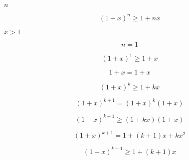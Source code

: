 \documentclass[10pt]{book}
\begin{document}
\begin{mdSnippets}
\begin{mdInlineSnippet}[7b8b965ad4bca0e41ab51de7b31363a1]%
$n$\end{mdInlineSnippet}%
\begin{mdDisplaySnippet}[f368a1526c7f504364b50aa4c541eb9f]%
\[%
(1 + x)^n \ge 1 + nx
\]%
\end{mdDisplaySnippet}%
\begin{mdInlineSnippet}[d0dfb6e138e2e13e9900819523d651fa]%
$x > 1$\end{mdInlineSnippet}%
\begin{mdDisplaySnippet}[ab78ccfbcd04b1ba22eb9427251cb20d]%
\[%
n = 1
\]%
\end{mdDisplaySnippet}%
\begin{mdDisplaySnippet}[d213d87543a5707039922f2022fb5e15]%
\[%
(1 + x)^1 \ge 1 + x
\]%
\end{mdDisplaySnippet}%
\begin{mdDisplaySnippet}[af12e9fe4c2d30b82ef9b33322d8890b]%
\[%
1 + x = 1 + x
\]%
\end{mdDisplaySnippet}%
\begin{mdDisplaySnippet}[599e8f94b0ed45cf9f5236d9879d57f4]%
\[%
(1 + x)^k \ge 1 + kx
\]%
\end{mdDisplaySnippet}%
\begin{mdDisplaySnippet}[31c9c43e2e03727806dd7f5014010353]%
\[%
(1 + x)^{k+1} = (1 + x)^k(1+x)  
\]%
\end{mdDisplaySnippet}%
\begin{mdDisplaySnippet}[d2f4a74515f36ec26b48f5077bafc2dd]%
\[%
(1 + x)^{k+1} \ge (1 + kx)(1 + x)
\]%
\end{mdDisplaySnippet}%
\begin{mdDisplaySnippet}[aa6cc59cde177e5a753a6c7a2e3a928f]%
\[%
(1 + x)^{k+1} = 1 + (k + 1)x + kx^2
\]%
\end{mdDisplaySnippet}%
\begin{mdDisplaySnippet}[7ce6aba1b945c6f9d05eb0d715b8f93d]%
\[%
(1 + x)^{k+1} \ge 1 + (k + 1)x
\]%
\end{mdDisplaySnippet}%
\begin{mdDisplaySnippet}[6904cef3f301c94a0fb1da23775ca5e0]%

\end{mdDisplaySnippet}
\end{mdSnippets}
\end{document}
